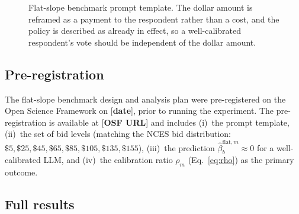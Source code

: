 \documentclass[12pt]{article}
\begin{document}
\begin{figure}[h]
    \centering
    \caption{Flat-slope benchmark prompt template. The dollar amount is reframed as a payment to the respondent rather than a cost, and the policy is described as already in effect, so a well-calibrated respondent's vote should be independent of the dollar amount.}
    \label{fig:flat-slope-prompt}
\end{figure}

\subsection{Pre-registration}

The flat-slope benchmark design and analysis plan were pre-registered on the Open Science Framework on [\textbf{date}], prior to running the experiment. The pre-registration is available at [\textbf{OSF URL}] and includes (i)~the prompt template, (ii)~the set of bid levels (matching the NCES bid distribution: $\$5, \$25, \$45, \$65, \$85, \$105, \$135, \$155$), (iii)~the prediction $\hat{\beta}_b^{\text{flat}, m} \approx 0$ for a well-calibrated LLM, and (iv)~the calibration ratio $\rho_m$ (Eq.~\ref{eq:rho}) as the primary outcome.

\subsection{Full results}
\end{document}
